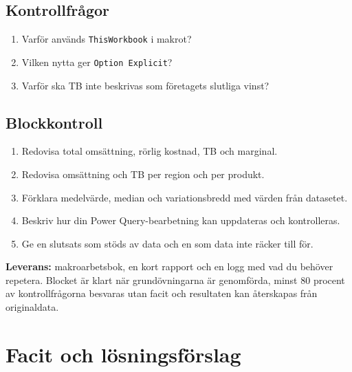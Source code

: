 \documentclass[11pt,a4paper]{article}
\begin{document}
\subsection*{Kontrollfrågor}
\begin{enumerate}
\item Varför används \texttt{ThisWorkbook} i makrot?
\item Vilken nytta ger \texttt{Option Explicit}?
\item Varför ska TB inte beskrivas som företagets slutliga vinst?
\end{enumerate}
\subsection*{Blockkontroll}
\begin{enumerate}
\item Redovisa total omsättning, rörlig kostnad, TB och marginal.
\item Redovisa omsättning och TB per region och per produkt.
\item Förklara medelvärde, median och variationsbredd med värden från datasetet.
\item Beskriv hur din Power Query-bearbetning kan uppdateras och kontrolleras.
\item Ge en slutsats som stöds av data och en som data inte räcker till för.
\end{enumerate}
\textbf{Leverans:} makroarbetsbok, en kort rapport och en logg med vad du behöver repetera. Blocket är klart när grundövningarna är genomförda, minst 80 procent av kontrollfrågorna besvaras utan facit och resultaten kan återskapas från originaldata.

\clearpage
\section{Facit och lösningsförslag}
\end{document}
